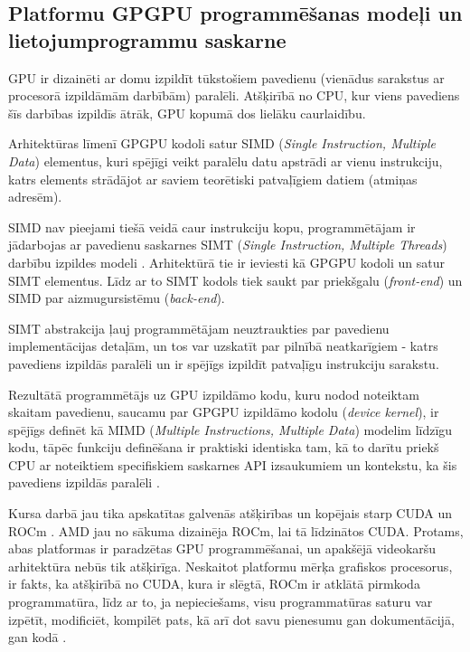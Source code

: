 \begin{center}
    \chapter{Platformu GPGPU programmēšanas modeļi un lietojumprogrammu
    saskarne}
\end{center}

GPU ir dizainēti ar domu izpildīt tūkstošiem pavedienu (vienādus sarakstus ar
procesorā izpildāmām darbībām) paralēli. Atšķirībā no CPU, kur viens pavediens
šīs darbības izpildīs ātrāk, GPU kopumā dos lielāku caurlaidību.

Arhitektūras līmenī GPGPU kodoli satur SIMD (\textit{Single Instruction,
Multiple Data}) elementus, kuri spējīgi veikt paralēlu datu apstrādi ar vienu
instrukciju, katrs elements strādājot ar saviem teorētiski patvaļīgiem datiem
(atmiņas adresēm).

SIMD nav pieejami tiešā veidā caur instrukciju kopu, programmētājam ir
jādarbojas ar pavedienu saskarnes SIMT (\textit{Single Instruction, Multiple
Threads}) darbību izpildes modeli \cite{GPGPU_gramata}. Arhitektūrā tie ir
ieviesti kā GPGPU kodoli un satur SIMT elementus. Līdz ar to SIMT kodols tiek
saukt par priekšgalu (\textit{front-end}) un SIMD par aizmugursistēmu
(\textit{back-end}).

SIMT abstrakcija ļauj programmētājam neuztraukties par pavedienu
implementācijas detaļām, un tos var uzskatīt par pilnībā neatkarīgiem - katrs
pavediens izpildās paralēli un ir spējīgs izpildīt patvaļīgu instrukciju
sarakstu.

Rezultātā programmētājs uz GPU izpildāmo kodu, kuru nodod noteiktam skaitam
pavedienu, saucamu par  GPGPU izpildāmo kodolu (\textit{device kernel}), ir
spējīgs definēt kā MIMD (\textit{Multiple Instructions, Multiple Data}) modelim
līdzīgu kodu, tāpēc funkciju definēšana ir praktiski identiska tam, kā to darītu
priekš CPU ar noteiktiem specifiskiem saskarnes API izsaukumiem un kontekstu,
ka šis pavediens izpildās paralēli \cite{kursa-darbs}.

Kursa darbā jau tika apskatītas galvenās atšķirības un kopējais starp CUDA un
ROCm \cite{kursa-darbs}. AMD jau no sākuma dizainēja ROCm, lai tā līdzinātos
CUDA. Protams, abas platformas ir paradzētas GPU programmēšanai, un apakšējā
videokaršu arhitektūra nebūs tik atšķirīga. Neskaitot platformu mērķa grafiskos
procesorus, ir fakts, ka atšķirībā no CUDA, kura ir slēgtā, ROCm ir atklātā
pirmkoda programmatūra, līdz ar to, ja nepieciešams, visu programmatūras saturu
var izpētīt, modificiēt, kompilēt pats, kā arī dot savu pienesumu gan
dokumentācijā, gan kodā \cite{what_is_ROCM}.

